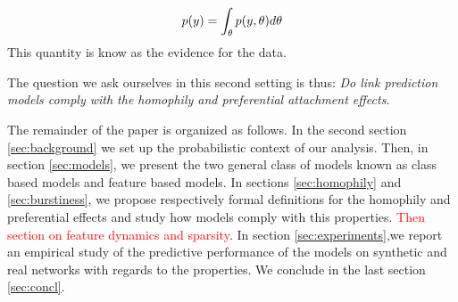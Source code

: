 \begin{equation}
p(y) = \int_{\theta} p(y,\theta) d\theta
\end{equation}
This quantity is know as the evidence for the data.

The question we ask ourselves in this second setting is thus: \textit{Do link prediction models comply with the homophily and preferential attachment effects}.


The remainder of the paper is organized as follows. In the second section \ref{sec:background} we set up the probabilistic context of our analysis. Then, in section \ref{sec:models}, we present the two general class of models known as class based models and feature based models. In sections \ref{sec:homophily} and \ref{sec:burstiness}, we propose respectively formal definitions for the homophily and preferential effects and study how models comply with this properties. \textcolor{red}{Then section on feature dynamics and sparsity}. In section \ref{sec:experiments},we report an empirical study of the predictive performance of the models on synthetic and real networks with regards to the properties. We conclude in the last section \ref{sec:concl}. 
